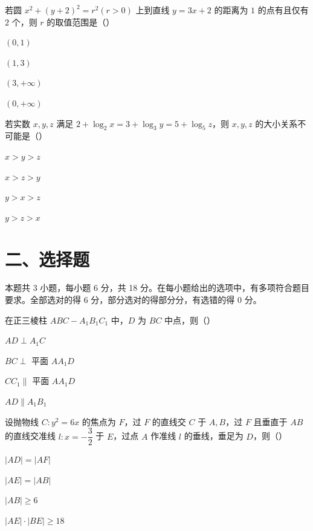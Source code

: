 \documentclass[zihao=-4]{exam-zh}
\begin{document}
\begin{question}[points=5]
若圆 $x^2+(y+2)^2=r^2(r>0)$ 上到直线 $y=3x+2$ 的距离为 $1$ 的点有且仅有 $2$ 个，则 $r$ 的取值范围是（\quad）
\begin{choices}
  \item $(0,1)$
  \item $(1,3)$
  \item $(3,+\infty)$
  \item $(0,+\infty)$
\end{choices}
\end{question}

\begin{question}[points=5]
若实数 $x,y,z$ 满足 $2+\log_2 x=3+\log_3 y=5+\log_5 z$，则 $x,y,z$ 的大小关系不可能是（\quad）
\begin{choices}
  \item $x>y>z$
  \item $x>z>y$
  \item $y>x>z$
  \item $y>z>x$
\end{choices}
\end{question}

\section*{二、选择题}

本题共 3 小题，每小题 6 分，共 18 分。在每小题给出的选项中，有多项符合题目要求。全部选对的得 6 分，部分选对的得部分分，有选错的得 0 分。

\begin{question}[points=6]
在正三棱柱 $ABC-A_1B_1C_1$ 中，$D$ 为 $BC$ 中点，则（\quad）
\begin{choices}
  \item $AD\perp A_1C$
  \item $BC\perp$ 平面 $AA_1D$
  \item $CC_1\parallel$ 平面 $AA_1D$
  \item $AD\parallel A_1B_1$
\end{choices}
\end{question}

\begin{question}[points=6]
设抛物线 $C:y^2=6x$ 的焦点为 $F$，过 $F$ 的直线交 $C$ 于 $A,B$，过 $F$ 且垂直于 $AB$ 的直线交准线 $l:x=-\dfrac32$ 于 $E$，过点 $A$ 作准线 $l$ 的垂线，垂足为 $D$，则（\quad）
\begin{choices}
  \item $|AD|=|AF|$
  \item $|AE|=|AB|$
  \item $|AB|\geq 6$
  \item $|AE|\cdot |BE|\geq 18$
\end{choices}
\end{question}
\end{document}
